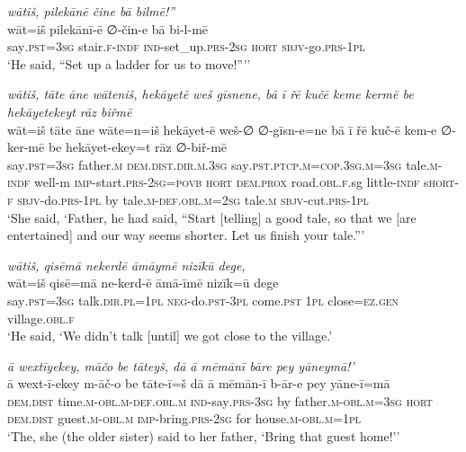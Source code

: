 \ea \label{ŽH.25}
\textit{wātiš, pilekānē čine bā bilmē!”} \\ 
\gll wāt=iš pilekānī-ē ∅-čin-e bā bi-l-mē \\ 
 say\textsc{.pst}\textsc{=3sg} stair\textsc{\textsc{.f}}\textsc{-indf} \textsc{ind-}set\_up\textsc{.prs}-\textsc{2sg} \textsc{hort} \textsc{sbjv-}go\textsc{.prs}\textsc{-1pl} \\ 
\glt `He said, “Set up a ladder for us to move!”’'
\z 
 
\ea \label{ŽH.27}
\textit{wātiš, tāte āne wāteniš, hekāyetē weš gīsnene, bā ī řē kučē keme kermē be hekāyetekeyt rāz biřmē} \\ 
\gll wāt=iš tāte āne wāte=n=iš hekāyet-ē weš-∅ ∅-gīsn-e=ne bā ī řē kuč-ē kem-e ∅-ker-mē be hekāyet-ekey=t rāz ∅-biř-mē \\ 
 say\textsc{.pst}\textsc{=3sg} father\textsc{.m} \textsc{dem.dist}\textsc{.dir}\textsc{.m}\textsc{.3sg} say\textsc{.pst}\textsc{.ptcp}\textsc{.m}\textsc{=cop}\textsc{.3sg}\textsc{.m}\textsc{=3sg} tale\textsc{.m}\textsc{-indf} well-m \textsc{imp-}start\textsc{.prs}-\textsc{2sg}\textsc{=\textsc{povb}} \textsc{hort} \textsc{dem.prox} road\textsc{.obl}\textsc{\textsc{.f}}.sg little\textsc{-indf} s\textsc{hort}\textsc{-f} \textsc{sbjv-}do\textsc{.prs}\textsc{-1pl} by tale\textsc{.m}\textsc{-def}\textsc{.obl}\textsc{.m}\textsc{=\textsc{2sg}} tale\textsc{.m} \textsc{sbjv-}cut\textsc{.prs}\textsc{-1pl} \\ 
\glt `She said, ‘Father, he had said, “Start [telling] a good tale, so that we [are entertained] and our way seems shorter. Let us finish your tale.”'
\z 
 
\ea \label{ŽH.30}
\textit{wātiš, qisēmā nekerdē āmāymē nizīkū dege,} \\ 
\gll wāt=iš qisē=mā ne-kerd-ē āmā-īmē nizīk=ū dege \\ 
 say\textsc{.pst}\textsc{=3sg} talk\textsc{.dir}\textsc{.pl}\textsc{=1pl} \textsc{neg-}do\textsc{.pst}\textsc{-3pl} come\textsc{.pst} \textsc{1pl} close\textsc{=ez}\textsc{.gen} village\textsc{.obl}\textsc{\textsc{.f}} \\ 
\glt `He said, ‘We didn’t talk [until] we got close to the village.'
\z 
 
\ea \label{ŽH.50}
\textit{ā wextīyekey, māčo be tāteyš, dā ā mēmānī bāre pey yāneymā!’} \\ 
\gll ā wext-ī-ekey m-āč-o be tāte-ī=š dā ā mēmān-ī b-ār-e pey yāne-ī=mā \\ 
 \textsc{dem.dist} time\textsc{.m}\textsc{-obl}\textsc{.m}\textsc{-def}\textsc{.obl}\textsc{.m} \textsc{ind-}say\textsc{.prs}\textsc{-3sg} by father\textsc{.m}\textsc{-obl}\textsc{.m}\textsc{=3sg} \textsc{hort} \textsc{dem.dist} guest\textsc{.m}\textsc{-obl}\textsc{.m} \textsc{imp-}bring\textsc{.prs}-\textsc{2sg} for house\textsc{.m}\textsc{-obl}\textsc{.m}\textsc{=1pl} \\ 
\glt `The, she (the older sister) said to her father, ‘Bring that guest home!’'
\z 
 
